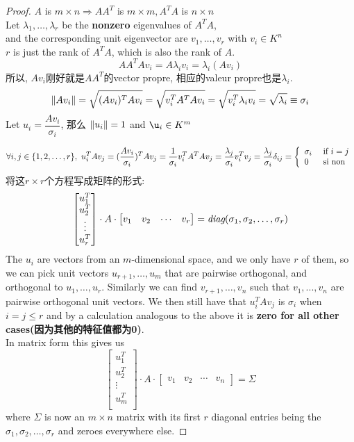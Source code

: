 \begin{proof}
$A$ is $m \times n \Rightarrow AA^T$ is $m \times m, A^T A$ is $n \times n$\\
Let $\lambda_1, \ldots, \lambda_r$ be the \textbf{nonzero} eigenvalues of $A^T A$, \\
and the corresponding unit eigenvector are $v_1, \ldots, v_r$ with $v_i \in K^n$\\
$r$ is just the rank of $A^T A$, which is also the rank of $A$.
$$A A^T A v_i = A \lambda_i v_i = \lambda_i (A v_i)$$
所以, $Av_i$刚好就是$A A^T$的vector propre, 相应的valeur propre也是$\lambda_i$.
$$\left\Vert Av_i\right\Vert = \sqrt{(Av_i)^T Av_i} = \sqrt{v_i^T A^T Av_i} = \sqrt{v_i^T \lambda_i v_i} = \sqrt{\lambda_i} \equiv \sigma_i$$
Let $u_i = \dfrac{Av_i}{\sigma_i}$, 那么 $\left\Vert u_i\right\Vert = 1$ and $\u_i \in K^m$

$$
\forall i, j \in \{1,2,\ldots, r\},\
u_i^T Av_j
= (\dfrac{Av_i}{\sigma_i})^T Av_j
= \dfrac{1}{\sigma_i} v_i^T A^T Av_j
= \dfrac{\lambda_j}{\sigma_i} v_i^T v_j
= \dfrac{\lambda_j}{\sigma_i} \delta_{ij}
=
\left\{
  \begin{array}{ll}
    \sigma_i & \textrm{\ if } i = j \\
    0 & \textrm{ si non}
  \end{array}
\right.
$$
将这$r \times r$个方程写成矩阵的形式:
$$
\begin{bmatrix}
u_1^T \\
u_2^T \\
\vdots \\
u_r^T \\
\end{bmatrix}
\cdot
A
\cdot
\begin{bmatrix}
v_1 & v_2 & \cdots & v_r
\end{bmatrix}
=\textit{diag}(\sigma_1, \sigma_2, \ldots, \sigma_r)
$$
The $u_i$ are vectors from an $m$-dimensional space, and we only have $r$ of them, so we can pick unit
vectors $u_{r+1}, \ldots, u_m$ that are pairwise orthogonal, and orthogonal to $u_1,\ldots, u_r$. Similarly we can
find $v_{r+1}, \ldots, v_n$ such that $v_1,...,v_n$ are pairwise orthogonal unit vectors. We then still have that
$u_i^T A v_j$ is $\sigma_i$ when $i = j \leq r$ and by a calculation analogous to the above it is
\textbf{zero for all other cases(因为其他的特征值都为0)}.\\
In matrix form this gives us
$$
\begin{bmatrix}
u_1^T \\
u_2^T \\
\vdots \\
u_m^T \\
\end{bmatrix}
\cdot
A
\cdot
\begin{bmatrix}
v_1 & v_2 & \cdots & v_n
\end{bmatrix}
=\Sigma
$$
where $\Sigma$ is now an $m \times n$ matrix with its first $r$ diagonal entries being the
$\sigma_1, \sigma_2, \ldots, \sigma_r$ and zeroes everywhere else.


\end{proof}
